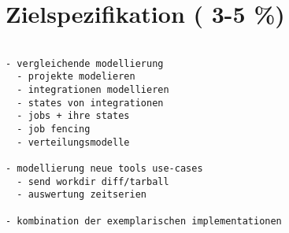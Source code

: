 \chapter{Zielspezifikation ( 3-5 \%)}

\begin{verbatim}

- vergleichende modellierung
  - projekte modelieren
  - integrationen modellieren
  - states von integrationen
  - jobs + ihre states
  - job fencing
  - verteilungsmodelle

- modellierung neue tools use-cases
  - send workdir diff/tarball
  - auswertung zeitserien

- kombination der exemplarischen implementationen


\end{verbatim}



